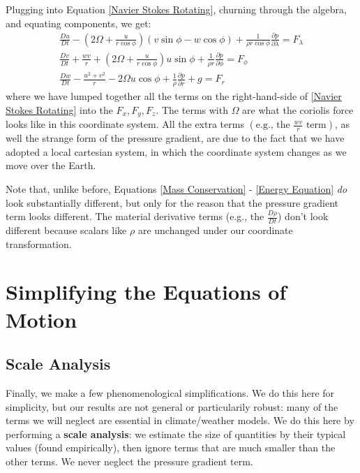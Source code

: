 Plugging into Equation \ref{Navier Stokes Rotating}, churning through the algebra, and equating components, we get:
\begin{align*}
    \frac{Du}{Dt}-\left( 2\Omega+\frac{u}{r\cos\phi} \right)\left( v\sin\phi-w\cos\phi \right)+\frac{1}{\rho r \cos\phi}\frac{\partial p}{\partial \lambda}
    =F_\lambda
    \\
    \frac{Dv}{Dt}+\frac{wv}{r}+\left( 2\Omega+\frac{u}{r\cos\phi} \right)u\sin\phi+\frac{1}{\rho r}\frac{\partial p}{\partial \phi}=F_\phi
    \\
    \frac{Dw}{Dt}-\frac{u^2+v^2}{r}-2\Omega u \cos\phi+\frac{1}{\rho}\frac{\partial p}{\partial r}+g=F_r
\end{align*}
where we have lumped together all the terms on the right-hand-side of \ref{Navier Stokes Rotating} into the \(F_x, F_y, F_z\). The terms with \(\Omega\) are what the coriolis force looks like in this coordinate system. All the extra terms \(\left( \text{e.g., the } \frac{wv}{r} \text{ term}\right)\), as well the strange form of the pressure gradient, are due to the fact that we have adopted a local cartesian system, in which the coordinate system changes as we move over the Earth.

Note that, unlike before, Equations \ref{Mass Conservation} - \ref{Energy Equation} \textit{do} look substantially different, but only for the reason that the pressure gradient term looks different. The material derivative terms (e.g., the \(\frac{D\rho}{Dt}\)) don't look different because scalars like \(\rho\) are unchanged under our coordinate transformation.

\section{Simplifying the Equations of Motion}

\subsection{Scale Analysis}\label{Scale Analysis}

Finally, we make a few phenomenological simplifications. We do this here for simplicity, but our results are not general or particularily robust: many of the terms we will neglect are essential in climate/weather models. We do this here by performing a \textbf{scale analysis}: we estimate the size of quantities by their typical values (found empirically), then ignore terms that are much smaller than the other terms. We never neglect the pressure gradient term. \vspace{5mm}

